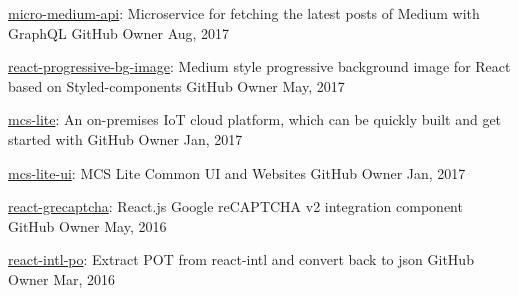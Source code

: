 \begin{cvhonors}
  \cvhonor
    {\href{https://github.com/evenchange4/micro-medium-api}{micro-medium-api}: \textmd{Microservice for fetching the latest posts of Medium with GraphQL}}
    {GitHub} %
    {Owner} %
    {Aug, 2017} %

  \cvhonor
    {\href{https://github.com/evenchange4/react-progressive-bg-image}{react-progressive-bg-image}: \textmd{Medium style progressive background image for React based on Styled-components}}
    {GitHub} %
    {Owner} %
    {May, 2017} %

  \cvhonor
    {\href{https://github.com/MCS-Lite/mcs-lite}{mcs-lite}: \textmd{An on-premises IoT cloud platform, which can be quickly built and get started with}}
    {GitHub} %
    {Owner} %
    {Jan, 2017} %

  \cvhonor
    {\href{https://github.com/MCS-Lite/mcs-lite}{mcs-lite-ui}: \textmd{MCS Lite Common UI and Websites}}
    {GitHub} %
    {Owner} %
    {Jan, 2017} %

  \cvhonor
    {\href{https://github.com/evenchange4/react-grecaptcha}{react-grecaptcha}: \textmd{React.js Google reCAPTCHA v2 integration component}}
    {GitHub} %
    {Owner} %
    {May, 2016} %

  \cvhonor
    {\href{https://github.com/evenchange4/react-intl-po}{react-intl-po}: \textmd{Extract POT from react-intl and convert back to json}}
    {GitHub} %
    {Owner} %
    {Mar, 2016} %

\end{cvhonors}
